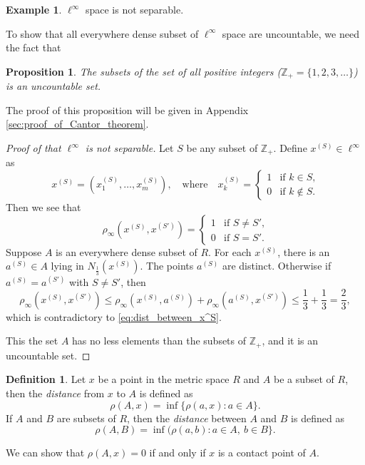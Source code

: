 \documentclass[a4paper,12pt]{article}
\newcommand{\intZ}{\mathbb{Z}}
\newtheorem{prop}[thm]{Proposition}
\theoremstyle{definition}
\newtheorem{defn}[thm]{Definition}
\newtheorem{expl}[thm]{Example}
\theoremstyle{remark}
\begin{document}
\begin{expl}
  $\ell^{\infty}$ space is not separable.
\end{expl}
  To show that all everywhere dense subset of $\ell^{\infty}$ space are uncountable, we need the fact that
  \begin{prop} \label{prop:Cantor_theorem}
    The subsets of the set of all positive integers ($\intZ_+ = \{ 1, 2, 3, \dotsc \}$) is an uncountable set.
  \end{prop}
  The proof of this proposition will be given in Appendix \ref{sec:proof_of_Cantor_theorem}.
\begin{proof}[Proof of that $\ell^{\infty}$ is not separable]
  Let $S$ be any subset of $\intZ_+$. Define $x^{(S)} \in \ell^{\infty}$ as
  \begin{equation*}
    x^{(S)} = (x^{(S)}_1, \dotsc, x^{(S)}_m), \quad \text{where} \quad x^{(S)}_k =
    \begin{cases}
      1 & \text{if $k \in S$,} \\
      0 & \text{if $k \not\in S$.}
    \end{cases}
  \end{equation*}
  Then we see that
  \begin{equation} \label{eq:dist_between_x^S}
    \rho_{\infty}(x^{(S)}, x^{(S')}) =
    \begin{cases}
      1 & \text{if $S \neq S'$,} \\
      0 & \text{if $S = S'$.}
    \end{cases}
  \end{equation}
  Suppose $A$ is an everywhere dense subset of $R$. For each $x^{(S)}$, there is an $a^{(S)} \in A$ lying in $N_{\frac{1}{3}}(x^{(S)})$. The points $a^{(S)}$ are distinct. Otherwise if $a^{(S)} = a^{(S')}$ with $S \neq S'$, then
  \begin{equation*}
    \rho_{\infty}(x^{(S)}, x^{(S')}) \leq \rho_{\infty}(x^{(S)}, a^{(S)}) + \rho_{\infty}(a^{(S)}, x^{(S')}) \leq \frac{1}{3} + \frac{1}{3} = \frac{2}{3},
  \end{equation*}
  which is contradictory to \eqref{eq:dist_between_x^S}.

  This the set $A$ has no less elements than the subsets of $\intZ_+$, and it is an uncountable set.
\end{proof}

\begin{defn}
  Let $x$ be a point in the metric space $R$ and $A$ be a subset of $R$, then the \emph{distance} from $x$ to $A$ is defined as
  \begin{equation*}
    \rho(A, x) = \inf \{ \rho(a, x) : a \in A \}.
  \end{equation*}
  If $A$ and $B$ are subsets of $R$, then the \emph{distance} between $A$ and $B$ is defined as
  \begin{equation*}
    \rho(A, B) = \inf(\rho(a, b) : a \in A, \ b \in B \}.
  \end{equation*}
\end{defn}
We can show that $\rho(A, x) = 0$ if and only if $x$ is a contact point of $A$.
\end{document}
